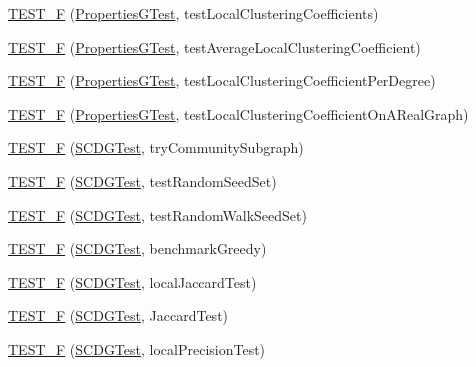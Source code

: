 \begin{DoxyCompactItemize}
\hyperlink{namespace_networ_kit_a44102354774f895136dd4a6cf1f2fafc}{T\-E\-S\-T\-\_\-\-F} (\hyperlink{class_networ_kit_1_1_properties_g_test}{Properties\-G\-Test}, test\-Local\-Clustering\-Coefficients)
\item 
\hyperlink{namespace_networ_kit_aa79421601a596cc3c6afb2afee2de669}{T\-E\-S\-T\-\_\-\-F} (\hyperlink{class_networ_kit_1_1_properties_g_test}{Properties\-G\-Test}, test\-Average\-Local\-Clustering\-Coefficient)
\item 
\hyperlink{namespace_networ_kit_a37ba1ff70939d0e33d9b4a4153b305e9}{T\-E\-S\-T\-\_\-\-F} (\hyperlink{class_networ_kit_1_1_properties_g_test}{Properties\-G\-Test}, test\-Local\-Clustering\-Coefficient\-Per\-Degree)
\item 
\hyperlink{namespace_networ_kit_a1d206727b7075b0161ce546f0374a3ea}{T\-E\-S\-T\-\_\-\-F} (\hyperlink{class_networ_kit_1_1_properties_g_test}{Properties\-G\-Test}, test\-Local\-Clustering\-Coefficient\-On\-A\-Real\-Graph)
\item 
\hyperlink{namespace_networ_kit_a201551027715f1b6cc6268dd75303f34}{T\-E\-S\-T\-\_\-\-F} (\hyperlink{class_networ_kit_1_1_s_c_d_g_test}{S\-C\-D\-G\-Test}, try\-Community\-Subgraph)
\item 
\hyperlink{namespace_networ_kit_ac37a0ea907ecc698ff7643f2f5ab0dbd}{T\-E\-S\-T\-\_\-\-F} (\hyperlink{class_networ_kit_1_1_s_c_d_g_test}{S\-C\-D\-G\-Test}, test\-Random\-Seed\-Set)
\item 
\hyperlink{namespace_networ_kit_a5b3bd6afa95a88865f2b1ebdb96dfffb}{T\-E\-S\-T\-\_\-\-F} (\hyperlink{class_networ_kit_1_1_s_c_d_g_test}{S\-C\-D\-G\-Test}, test\-Random\-Walk\-Seed\-Set)
\item 
\hyperlink{namespace_networ_kit_a5d0def23ef79e06271dfeba4eb4bf9c7}{T\-E\-S\-T\-\_\-\-F} (\hyperlink{class_networ_kit_1_1_s_c_d_g_test}{S\-C\-D\-G\-Test}, benchmark\-Greedy)
\item 
\hyperlink{namespace_networ_kit_a26ab9ef287454203a5ef95bc5375a609}{T\-E\-S\-T\-\_\-\-F} (\hyperlink{class_networ_kit_1_1_s_c_d_g_test}{S\-C\-D\-G\-Test}, local\-Jaccard\-Test)
\item 
\hyperlink{namespace_networ_kit_a09608fa68e503d77210946ad4012bb69}{T\-E\-S\-T\-\_\-\-F} (\hyperlink{class_networ_kit_1_1_s_c_d_g_test}{S\-C\-D\-G\-Test}, Jaccard\-Test)
\item 
\hyperlink{namespace_networ_kit_a31a74fb1ef77cecf930eb29078874bb9}{T\-E\-S\-T\-\_\-\-F} (\hyperlink{class_networ_kit_1_1_s_c_d_g_test}{S\-C\-D\-G\-Test}, local\-Precision\-Test)
\item 

\end{DoxyCompactItemize}

